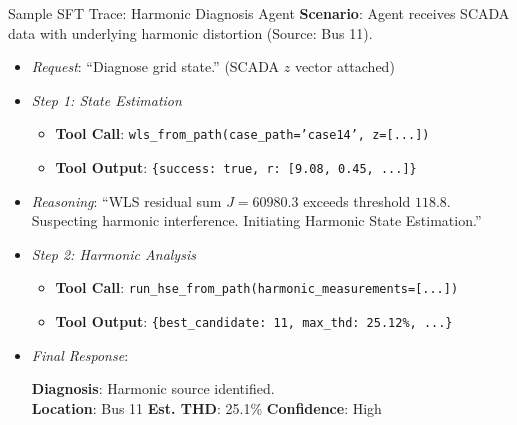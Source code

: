\documentclass[aspectratio=169]{beamer}
\begin{document}
\begin{frame}[fragile]{Sample SFT Trace: Harmonic Diagnosis Agent}
    \footnotesize
    \textbf{Scenario}: Agent receives SCADA data with underlying harmonic distortion (Source: Bus 11).
    
    \vspace{0.2cm}
    
    \begin{itemize}
        \setlength\itemsep{0.2cm}
        
        \item[\textbf{User}] \textit{Request}: ``Diagnose grid state.'' (SCADA $z$ vector attached)
        
        \item[\textbf{Agent}] \textit{Step 1: State Estimation}
        \begin{itemize}
            \item \textbf{Tool Call}: \texttt{wls\_from\_path(case\_path='case14', z=[...])}
            \item \textbf{Tool Output}: \texttt{\{success: true, r: [9.08, 0.45, ...]\}}
        \end{itemize}
        
        \item[\textbf{Agent}] \textit{Reasoning}: 
        ``WLS residual sum $J=60980.3$ exceeds threshold $118.8$. Suspecting harmonic interference. Initiating Harmonic State Estimation.''
        
        \item[\textbf{Agent}] \textit{Step 2: Harmonic Analysis}
        \begin{itemize}
            \item \textbf{Tool Call}: \texttt{run\_hse\_from\_path(harmonic\_measurements=[...])}
            \item \textbf{Tool Output}: \texttt{\{best\_candidate: 11, max\_thd: 25.12\%, ...\}}
        \end{itemize}
        
        \item[\textbf{Agent}] \textit{Final Response}:
        \begin{tcolorbox}[colback=green!5!white,colframe=green!50!black, boxrule=0.5pt, sharp corners=south]
            \textbf{Diagnosis}: Harmonic source identified.\\
            \textbf{Location}: Bus 11 \quad \textbf{Est. THD}: 25.1\% \quad \textbf{Confidence}: High
        \end{tcolorbox}
    \end{itemize}
\end{frame}
\end{document}
